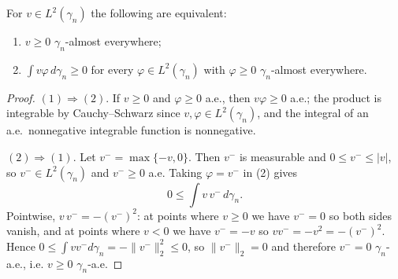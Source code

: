 \begin{lemma}
For $v \in L^2(\gamma_n)$ the following are equivalent:
\begin{enumerate}
\item $v \geq 0$ $\gamma_n$-almost everywhere;
\item $\int v \varphi \, d\gamma_n \geq 0$ for every $\varphi \in L^2(\gamma_n)$
with $\varphi \geq 0$ $\gamma_n$-almost everywhere.
\end{enumerate}
\end{lemma}
\begin{proof}
$(1) \Rightarrow (2)$.  If $v \geq 0$ and $\varphi \geq 0$ a.e., then
$v\varphi \geq 0$ a.e.; the product is integrable by Cauchy--Schwarz since
$v, \varphi \in L^2(\gamma_n)$, and the integral of an a.e.\ nonnegative
integrable function is nonnegative.

$(2) \Rightarrow (1)$.  Let $v^- = \max\{-v, 0\}$.  Then $v^-$ is measurable and
$0 \leq v^- \leq |v|$, so $v^- \in L^2(\gamma_n)$ and $v^- \geq 0$ a.e.  Taking
$\varphi = v^-$ in (2) gives
\[
  0 \leq \int v\, v^- \, d\gamma_n .
\]
Pointwise, $v \, v^- = -(v^-)^2$: at points where $v \geq 0$ we have $v^- = 0$ so
both sides vanish, and at points where $v < 0$ we have $v^- = -v$ so
$v v^- = -v^2 = -(v^-)^2$.  Hence
$0 \leq \int v v^- d\gamma_n = -\|v^-\|_2^2 \leq 0$, so $\|v^-\|_2 = 0$ and
therefore $v^- = 0$ $\gamma_n$-a.e., i.e. $v \geq 0$ $\gamma_n$-a.e.
\end{proof}
